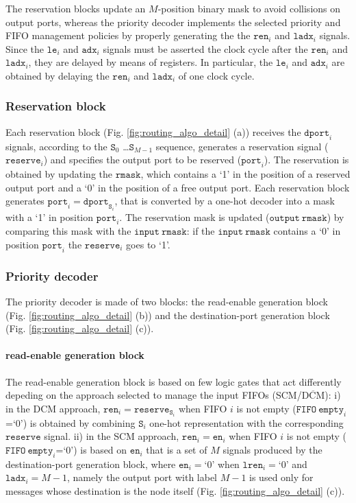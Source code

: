 \documentclass[10pt,twocolumn,journal]{IEEEtran}
\begin{document}
The reservation blocks update an $M$-position binary mask to avoid collisions on output ports, whereas the 
priority decoder implements the selected priority and FIFO management policies by properly generating the 
the $\mathtt{ren}_i$ and $\mathtt{ladx}_i$ signals. 
Since the $\mathtt{le}_i$ and $\mathtt{adx}_i$ signals 
must be asserted the clock cycle after the $\mathtt{ren}_i$ and $\mathtt{ladx}_i$, they are delayed by means of registers. 
In particular, the $\mathtt{le}_i$ and $\mathtt{adx}_i$ are obtained by delaying the $\mathtt{ren}_i$ and $\mathtt{ladx}_i$ of one clock cycle.

\subsubsection{Reservation block}
Each reservation block (Fig. \ref{fig:routing_algo_detail} (a)) receives the $\mathtt{dport}_i$ signals, according 
to the $\mathtt{S}_0$ \dots $\mathtt{S}_{M-1}$ sequence, generates a reservation 
signal ($\mathtt{reserve}_i$) and specifies the output port to be reserved ($\mathtt{port}_i$).
The reservation is obtained by updating the $\mathtt{rmask}$, which contains a `1' in the position of 
a reserved output port and a `0' in the position of a free output port. Each reservation block generates 
$\mathtt{port}_i = \mathtt{dport}_{\mathtt{S}_i}$, that is converted by a one-hot decoder into a mask with a 
`1' in position $\mathtt{port}_i$. The reservation mask is updated ($\mathtt{output~rmask}$)
by comparing this mask with the
$\mathtt{input~rmask}$: if the $\mathtt{input~rmask}$ contains a `0' in position $\mathtt{port}_i$ 
the $\mathtt{reserve}_i$ goes to `1'.

\subsubsection{Priority decoder}
The priority decoder is made of two blocks: the read-enable generation block (Fig. \ref{fig:routing_algo_detail} (b)) 
and the destination-port generation block (Fig. \ref{fig:routing_algo_detail} (c)). 

\paragraph{read-enable generation block}
The read-enable generation block is based on few logic gates that act differently depeding on the approach selected 
to manage the input FIFOs (SCM/$\overline{\mathrm{DCM}}$): i) in the DCM approach, 
$\mathtt{ren}_i = \mathtt{reserve}_{\mathtt{S}_i}$ when FIFO $i$ is not empty ($\mathtt{FIFO~empty}_i$=`0') 
is obtained by combining $\mathtt{S}_i$ one-hot representation with the corresponding $\mathtt{reserve}$ signal.
ii) in the SCM approach, 
$\mathtt{ren}_i = \mathtt{en}_i$ when FIFO $i$ is not empty ($\mathtt{FIFO~empty}_i$=`0') 
is based on $\mathtt{en}_i$ that is a set of $M$ signals produced by the destination-port generation block, 
where $\mathtt{en}_i=$`0' when $\mathtt{lren}_i=$`0' and $\mathtt{ladx}_i = M-1$, namely 
the output port with label $M-1$ is used only for messages whose destination is the node itself 
(Fig. \ref{fig:routing_algo_detail} (c)).
\end{document}
